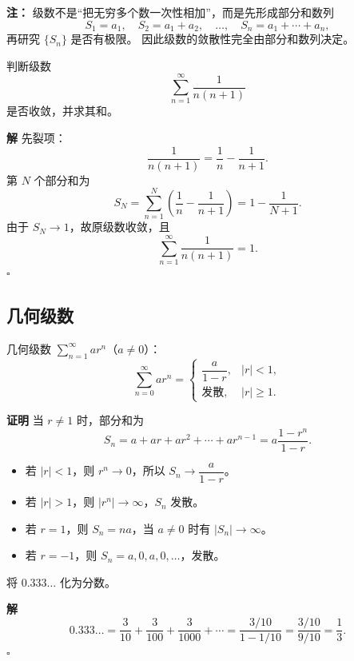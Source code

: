 \documentclass[fontset=fandol]{ctexart}
\newenvironment{custom}[1]{\par\noindent\textbf{#1}\quad}{\par\vspace{0.8em}}
\newenvironment{solution}{\par\noindent\textbf{解}\quad}{\hfill$\square$\par\vspace{0.8em}}
\begin{document}
\begin{custom}{注：}
级数不是“把无穷多个数一次性相加”，而是先形成部分和数列
\[
S_1=a_1,\quad S_2=a_1+a_2,\quad \ldots,\quad S_n=a_1+\cdots+a_n,
\]
再研究 $\{S_n\}$ 是否有极限。 因此级数的敛散性完全由部分和数列决定。
\end{custom}

\begin{example}
判断级数
\[
\sum_{n=1}^{\infty}\frac{1}{n(n+1)}
\]
是否收敛，并求其和。
\end{example}
\begin{solution}
先裂项：
\[
\frac{1}{n(n+1)}=\frac1n-\frac{1}{n+1}.
\]
第 $N$ 个部分和为
\[
S_N=\sum_{n=1}^{N}\left(\frac1n-\frac{1}{n+1}\right)
=1-\frac{1}{N+1}.
\]
由于 $S_N\to1$，故原级数收敛，且
\[
\sum_{n=1}^{\infty}\frac{1}{n(n+1)}=1.
\]
\end{solution}

\subsection*{几何级数}

\begin{example}[几何级数]
几何级数 \(\sum\limits_{n = 1}^{  \infty } ar^n\)（\(a \neq 0\)）：
\[
\sum_{n=0}^{\infty} ar^n = 
\begin{cases}
\dfrac{a}{1-r}, & |r| < 1,\\[6pt]
\text{发散}, & |r| \geq 1.
\end{cases}
\]
\end{example}

\begin{custom}{证明}
当 \(r \neq 1\) 时，部分和为
\[
S_n = a + ar + ar^2 + \cdots + ar^{n-1} = a\dfrac{1-r^n}{1-r}.
\]
\begin{itemize}
\item 若 \(|r| < 1\)，则 \(r^n \to 0\)，所以 \(S_n \to \dfrac{a}{1-r}\)。
\item 若 \(|r| > 1\)，则 \(|r^n| \to \infty\)，\(S_n\) 发散。
\item 若 \(r=1\)，则 \(S_n=na\)，当 \(a\neq0\) 时有 \(|S_n|\to\infty\)。
\item 若 \(r = -1\)，则 \(S_n = a, 0, a, 0, \dots\)，发散。
\end{itemize}
\end{custom}

\begin{example}[应用：循环小数化分数]
将 \(0.333\ldots\) 化为分数。
\end{example}
\begin{solution}
\[
0.333\ldots = \dfrac{3}{10} + \dfrac{3}{100} + \dfrac{3}{1000} + \cdots = \dfrac{3/10}{1-1/10} = \dfrac{3/10}{9/10} = \dfrac{1}{3}.
\]
\end{solution}
\end{document}
